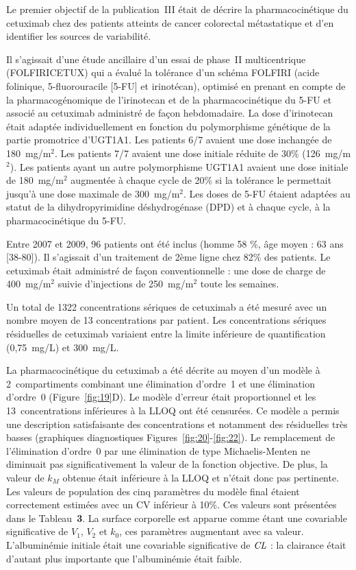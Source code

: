 Le premier objectif de la publication~III était de décrire la pharmacocinétique du cetuximab chez des patients atteints de cancer colorectal métastatique et d'en identifier les sources de variabilité. 

Il s'agissait d'une étude ancillaire d'un essai de phase~II multicentrique (FOLFIRICETUX) qui a évalué la tolérance d'un schéma FOLFIRI (acide folinique, 5-fluorouracile [5-FU] et irinotécan), optimisé en prenant en compte de la pharmacogénomique de l'irinotecan et de la pharmacocinétique du 5-FU et associé au cetuximab administré de façon hebdomadaire. La dose d'irinotecan était adaptée individuellement en fonction du polymorphisme génétique de la partie promotrice d'UGT1A1. Les patients 6/7 avaient une dose inchangée de 180~mg/m$^2$. Les patients 7/7 avaient une dose initiale réduite de 30\% (126~mg/m$^2$). Les patients ayant un autre polymorphisme UGT1A1 avaient une dose initiale de 180~mg/m$^2$ augmentée à chaque cycle de 20\% si la tolérance le permettait jusqu'à une dose maximale de 300~mg/m$^2$. Les doses de 5-FU étaient adaptées au statut de la dihydropyrimidine déshydrogénase (DPD) et à chaque cycle, à la pharmacocinétique du 5-FU.

Entre 2007 et 2009, 96 patients ont été inclus (homme 58 \%, âge moyen : 63 ans [38-80]). Il s'agissait d'un traitement de 2ème ligne chez 82\% des patients. Le cetuximab était administré de façon conventionnelle : une dose de charge de 400~mg/m$^2$ suivie d'injections de 250~mg/m$^2$ toute les semaines. 

Un total de 1322 concentrations sériques de cetuximab a été mesuré avec un nombre moyen de 13 concentrations par patient. Les concentrations sériques résiduelles de cetuximab variaient entre la limite inférieure de quantification (0,75~mg/L) et 300~mg/L.

La pharmacocinétique du cetuximab a été décrite au moyen d'un modèle à 2~compartiments combinant une élimination d'ordre~1 et une élimination d'ordre~0 (Figure~\ref{fig:19}D). Le modèle d'erreur était proportionnel et les 13~concentrations inférieures à la LLOQ ont été censurées. Ce modèle a permis une description satisfaisante des concentrations et notamment des résiduelles très basses (graphiques diagnostiques Figures~\ref{fig:20}-\ref{fig:22}). Le remplacement de l'élimination d'ordre~0 par une élimination de type Michaelis-Menten ne diminuait pas significativement la valeur de la fonction objective. De plus, la valeur de $k_M$ obtenue était inférieure à la LLOQ et n'était donc pas pertinente. Les valeurs de population des cinq paramètres du modèle final étaient correctement estimées avec un CV inférieur à 10\%. Ces valeurs sont présentées dans le Tableau~\textbf{3}. La surface corporelle est apparue comme étant une covariable significative de $V_1$, $V_2$ et $k_0$, ces paramètres augmentant avec sa valeur. L'albuminémie initiale était une covariable significative de $\operatorname{\textit{CL}}$ : la clairance était d'autant plus importante que l'albuminémie était faible.


